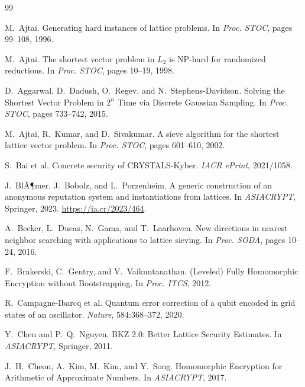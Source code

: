 ﻿\documentclass[a4paper,12pt]{article}
\theoremstyle{definition}
\begin{document}
\begin{thebibliography}{99}

M.~Ajtai.
\newblock Generating hard instances of lattice problems.
\newblock In \textit{Proc. STOC}, pages 99--108, 1996.

M.~Ajtai.
\newblock The shortest vector problem in $L_2$ is NP-hard for randomized reductions.
\newblock In \textit{Proc. STOC}, pages 10--19, 1998.

D.~Aggarwal, D.~Dadush, O.~Regev, and N.~Stephens-Davidson.
\newblock Solving the Shortest Vector Problem in $2^n$ Time via Discrete
  Gaussian Sampling.
\newblock In \textit{Proc. STOC}, pages 733--742, 2015.

M.~Ajtai, R.~Kumar, and D.~Sivakumar.
\newblock A sieve algorithm for the shortest lattice vector problem.
\newblock In \textit{Proc. STOC}, pages 601--610, 2002.

S.~Bai et al.
\newblock Concrete security of CRYSTALS-Kyber.
\newblock \textit{IACR ePrint}, 2021/1058.

J.~BlÃ¶mer, J.~Bobolz, and L.~Porzenheim.
\newblock A generic construction of an anonymous reputation system and
  instantiations from lattices.
\newblock In \textit{ASIACRYPT}, Springer, 2023.
\newblock \url{https://ia.cr/2023/464}.

A.~Becker, L.~Ducas, N.~Gama, and T.~Laarhoven.
\newblock New directions in nearest neighbor searching with applications to
  lattice sieving.
\newblock In \textit{Proc. SODA}, pages 10--24, 2016.

F.~Brakerski, C.~Gentry, and V.~Vaikuntanathan.
\newblock (Leveled) Fully Homomorphic Encryption without Bootstrapping.
\newblock In \textit{Proc. ITCS}, 2012.

R.~Campagne-Ibarcq et al.
\newblock Quantum error correction of a qubit encoded in grid states of an
  oscillator.
\newblock \textit{Nature}, 584:368--372, 2020.

Y.~Chen and P.~Q.~Nguyen.
\newblock BKZ 2.0: Better Lattice Security Estimates.
\newblock In \textit{ASIACRYPT}, Springer, 2011.

J.~H.~Cheon, A.~Kim, M.~Kim, and Y.~Song.
\newblock Homomorphic Encryption for Arithmetic of Approximate Numbers.
\newblock In \textit{ASIACRYPT}, 2017.


\end{thebibliography}
\end{document}
